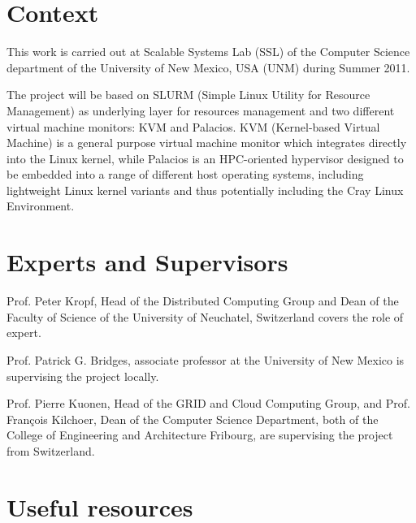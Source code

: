 \documentclass[10pt,authoryear]{sigplanconf} %
\begin{document}

\appendix
\section{Context}

This work is carried out at Scalable Systems Lab (SSL) of the Computer Science department of the University of New Mexico, USA (UNM) during Summer 2011.

The project will be based on SLURM (Simple Linux Utility for Resource Management) as underlying layer for resources management and two different virtual machine monitors: KVM and Palacios. KVM (Kernel-based Virtual Machine) is a general purpose virtual machine monitor which integrates directly into the Linux kernel, while Palacios is an HPC-oriented hypervisor designed to be embedded into a range of different host operating systems, including lightweight Linux kernel variants and thus potentially including the Cray Linux Environment.


\section{Experts and Supervisors}

Prof. Peter Kropf, Head of the Distributed Computing Group and Dean of the Faculty of Science of the University of Neuchatel, Switzerland covers the role of expert.

Prof. Patrick G. Bridges, associate professor at the University of New Mexico is supervising the project locally.

Prof. Pierre Kuonen, Head of the GRID and Cloud Computing Group, and Prof. Fran\c{c}ois Kilchoer, Dean of the Computer Science Department, both of the College of Engineering and Architecture Fribourg, are supervising the project from Switzerland.


\section{Useful resources}
\end{document}
